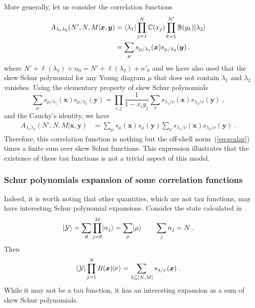 \documentclass[a4paper,11pt]{amsart}
\begin{document}
More generally, let us consider the correlation functions 
\begin{equation}
\begin{split}
  A_{\lambda_1 \lambda_2}(N', N, M|\bm{x}, \bm{y}) & =
  \langle\lambda_1\rvert \prod_{j=1}^N \mathbb{C}(x_j)
  \prod_{k=1}^{N'} \mathbb{B}(y_k)\lvert\lambda_2\rangle \\
  & = \sum_{\mu} s_{\mu/\lambda_1}(\bm{x}) s_{\mu/\lambda_2}(\bm{y}) \; .
\end{split}
\end{equation}
where \(N' + \ell(\lambda_2) + n_0 = N' + \ell(\lambda_2) + n'_0\) and
we have also used that the skew Schur polynomial for any Young diagram
\(\mu\) that does not contain \(\lambda_1\) and \(\lambda_2\)
vanishes. Using the elementary property of skew Schur
polynomials~\cite{Macdonald:1998}
\begin{equation}
  \sum_{\mu} s_{\mu/\lambda_1}(\bm{x}) s_{\mu/\lambda_2}(\bm{y}) = \prod_{i,j}\frac{1}{1 - x_i y_j}
 \sum_\nu s_{\lambda_1/\nu}(\bm{x}) s_{\lambda_2/\nu}(\bm{y})\; ,
\end{equation}
and the Cauchy's identity, we have 
\begin{equation}
\begin{split}
  A_{\lambda_1 \lambda_2}(N', N, M|\bm{x}, \bm{y}) & =
 \sum_\mu s_{\mu}(\bm{x}) s_{\mu}(\bm{y})
 \sum_\nu s_{\lambda_1/\nu}(\bm{x}) s_{\lambda_2/\nu}(\bm{y})\; .
\end{split}
\end{equation}
Therefore, this correlation function is nothing but the off-shell
norm~(\ref{eq:scalar}) times a finite sum over skew Schur
functions. This expression illustrates that the existence of these tau
functions is not a trivial aspect of this model.


\subsubsection{Schur polynomials expansion of some correlation functions}
Indeed, it is worth noting that other quantities, which are not tau
functions, may have interesting Schur polynomial expansions. Consider
the state calculated in~\cite{Bogoliubov2005}.
\begin{equation}
  \lvert\mathcal{Y}\rangle =
 \sum_{\vec{n}} \prod_{j=0}^M \lvert n_j\rangle = \sum_\mu \lvert\mu\rangle \qquad \sum_j n_j = N\; .
\end{equation}
Then
\begin{equation}
 \langle\mathcal{Y}\rvert \prod_{j=1}^N B(\bm{x}) \lvert\nu\rangle = 
  \sum_{\lambda\subseteq [N,M]} s_{\lambda/\nu}(\bm{x})\; . 
\end{equation}
While it may not be a tau function, it has an interesting expansion as
a sum of skew Schur polynomials.
\end{document}

